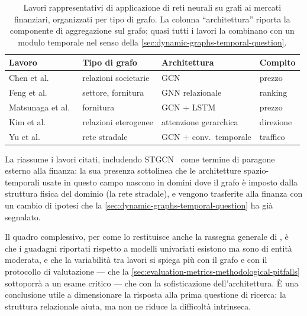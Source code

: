 \begin{table}[H]
\centering
\caption[Lavori GNN su mercati finanziari per tipo di grafo]{Lavori rappresentativi di applicazione di reti neurali su grafi ai mercati finanziari, organizzati per tipo di grafo. La colonna \enquote{architettura} riporta la componente di aggregazione sul grafo; quasi tutti i lavori la combinano con un modulo temporale nel senso della \cref{sec:dynamic-graphs-temporal-question}.}
\label{tab:gnn-finance-works}
\small
\begin{tabular}{@{}llll@{}}
\toprule
\textbf{Lavoro} & \textbf{Tipo di grafo} & \textbf{Architettura} & \textbf{Compito} \\
\midrule
Chen et al.~\cite{chen2018incorporating}  & relazioni societarie & GCN & prezzo \\
Feng et al.~\cite{feng2019temporal}       & settore, fornitura   & GNN relazionale & ranking \\
Matsunaga et al.~\cite{matsunaga2019exploring} & fornitura       & GCN + LSTM & prezzo \\
Kim et al.~\cite{kim2019hats}             & relazioni eterogenee & attenzione gerarchica & direzione \\
Yu et al.~\cite{yu2018stgcn}              & rete stradale        & GCN + conv.\ temporale & traffico \\
\bottomrule
\end{tabular}
\end{table}

La  riassume i lavori citati, includendo STGCN~\cite{yu2018stgcn} come termine di paragone esterno alla finanza: la sua presenza sottolinea che le architetture spazio-temporali usate in questo campo nascono in domini dove il grafo è imposto dalla struttura fisica del dominio (la rete stradale), e vengono trasferite alla finanza con un cambio di ipotesi che la \cref{sec:dynamic-graphs-temporal-question} ha già segnalato.

Il quadro complessivo, per come lo restituisce anche la rassegna generale di \textcite{wu2021survey}, è che i guadagni riportati rispetto a modelli univariati esistono ma sono di entità moderata, e che la variabilità tra lavori si spiega più con il grafo e con il protocollo di valutazione — che la \cref{sec:evaluation-metrics-methodological-pitfalls} sottoporrà a un esame critico — che con la sofisticazione dell'architettura. È una conclusione utile a dimensionare la risposta alla prima questione di ricerca: la struttura relazionale aiuta, ma non ne riduce la difficoltà intrinseca.

